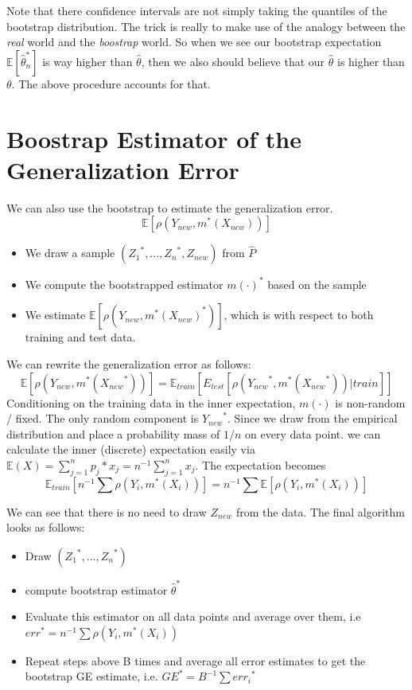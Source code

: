 \documentclass[]{book}
\providecommand{\tightlist}{%
  \setlength{\itemsep}{0pt}\setlength{\parskip}{0pt}}
\begin{document}
Note that there confidence intervals are not simply taking the quantiles
of the bootstrap distribution. The trick is really to make use of the
analogy between the \emph{real} world and the \emph{boostrap} world. So
when we see our bootstrap expectation \(\mathbb{E}[\hat{\theta}^*_n]\)
is way higher than \(\hat{\theta}\), then we also should believe that
our \(\hat{\theta}\) is higher than \(\theta\). The above procedure
accounts for that.

\section{Boostrap Estimator of the Generalization
Error}\label{boostrap-estimator-of-the-generalization-error}

We can also use the bootstrap to estimate the generalization error.
\[ \mathbb{E}[\rho(Y_{new}, m^*(X_{new}))] \]

\begin{itemize}
\tightlist
\item
  We draw a sample \(({Z_1}^*, ..., {Z_n}^*, Z_{new})\) from \(\hat{P}\)
\item
  We compute the bootstrapped estimator \({m(\cdot)}^*\) based on the
  sample
\item
  We estimate \(\mathbb{E}[\rho(Y_{new}, {m^*(X_{new})}^*)]\), which is
  with respect to both training and test data.
\end{itemize}

We can rewrite the generalization error as follows:
\[ \mathbb{E}[\rho(Y_{new}, m^*({X_{new}}^*))] = \mathbb{E}_{train}[E_{test}[\rho({Y_{new}}^*, m^*({X_{new}}^*))| train]]\]
Conditioning on the training data in the inner expectation, \(m(\cdot)\)
is non-random / fixed. The only random component is \({Y_{new}}^*\).
Since we draw from the empirical distribution and place a probability
mass of \(1/n\) on every data point. we can calculate the inner
(discrete) expectation easily via
\(\mathbb{E}(X) = \sum\limits_{j = 1}^n p_j * x_j = n^{-1} \sum\limits_{j = 1}^n x_j\).
The expectation becomes
\[ \mathbb{E}_{train}[n^{-1}\sum\rho(Y_{i}, m^*(X_{i}))] =  n^{-1}\sum\mathbb{E}[\rho(Y_{i}, m^*(X_{i}))]\]

We can see that there is no need to draw \(Z_{new}\) from the data. The
final algorithm looks as follows:

\begin{itemize}
\tightlist
\item
  Draw \(({Z_1}^*, ..., {Z_n}^*)\)
\item
  compute bootstrap estimator \({\hat{\theta}}^*\)
\item
  Evaluate this estimator on all data points and average over them, i.e
  \(err^* = n^{-1} \sum \rho(Y_i, m^*(X_i))\)
\item
  Repeat steps above B times and average all error estimates to get the
  bootstrap GE estimate, i.e. \(GE^* = B^{-1} \sum {err_i}^*\)
\end{itemize}
\end{document}
